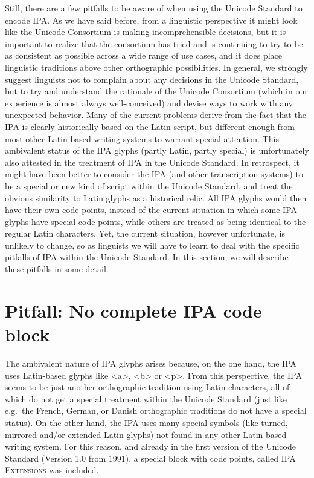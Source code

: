 Still, there are a few pitfalls to be aware of when using the Unicode Standard
to encode IPA. As we have said before, from a linguistic perspective it might
look like the Unicode Consortium is making incomprehensible decisions, but it is
important to realize that the consortium has tried and is continuing to try to
be as consistent as possible across a wide range of use cases, and it does place
linguistic traditions above other orthographic possibilities. In general, we
strongly suggest linguists not to complain about any decisions in the Unicode
Standard, but to try and understand the rationale of the Unicode Consortium
(which in our experience is almost always well-conceived) and devise ways to
work with any unexpected behavior. Many of the current problems derive from the
fact that the IPA is clearly historically based on the Latin script, but
different enough from most other Latin-based writing systems to warrant special
attention. This ambivalent status of the IPA glyphs (partly Latin, partly
special) is unfortunately also attested in the treatment of IPA in the Unicode
Standard. In retrospect, it might have been better to consider the IPA (and
other transcription systems) to be a special or new kind of script within the
Unicode Standard, and treat the obvious similarity to Latin glyphs as a
historical relic. All IPA glyphs would then have their own code points, instead
of the current situation in which some IPA glyphs have special code points,
while others are treated as being identical to the regular Latin characters.
Yet, the current situation, however unfortunate, is unlikely to change, so as
linguists we will have to learn to deal with the specific pitfalls of IPA within
the Unicode Standard. In this section, we will describe these pitfalls in some
detail.

\section{Pitfall: No complete IPA code block}
\label{pitfall-no-complete-ipa-block}

The ambivalent nature of IPA glyphs arises because, on the one hand, the IPA
uses Latin-based glyphs like <a>, <b> or <p>. From this perspective, the IPA
seems to be just another orthographic tradition using Latin characters, all of
which do not get a special treatment within the Unicode Standard (just like
e.g.~the French, German, or Danish orthographic traditions do not have a special
status). On the other hand, the IPA uses many special symbols (like turned,
mirrored and/or extended Latin glyphs) not found in any other Latin-based
writing system. For this reason, and already in the first version of the Unicode
Standard (Version 1.0 from 1991), a special block with code points, called
\textsc{IPA Extensions} was included. 

